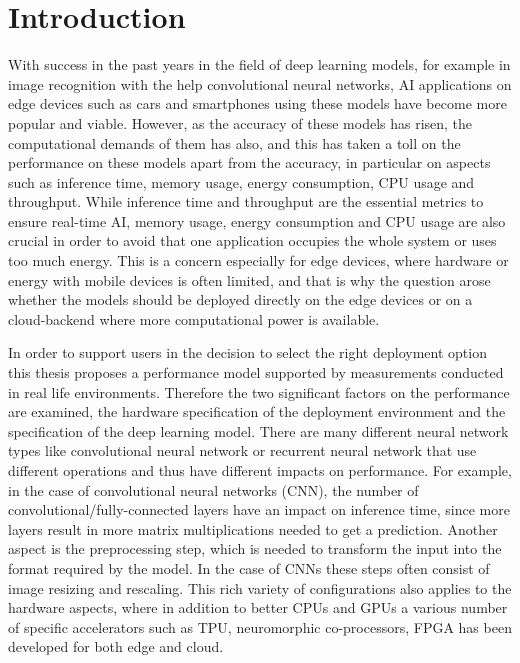 \chapter{Introduction}



With success in the past years in the field of deep learning models, for example in image recognition with the help convolutional neural networks, AI applications on edge devices such as cars and smartphones using these models have become more popular and viable.
However, as the accuracy of these models has risen, the computational demands of them has also, and this has taken a toll on the performance on these models apart from the accuracy, in particular on aspects such as inference time, memory usage, energy consumption, CPU usage and throughput. 
While inference time and throughput are the essential metrics to ensure real-time AI, memory usage, energy consumption and CPU usage are also crucial in order to avoid that one application occupies the whole system or uses too much energy.
This is a concern especially for edge devices, where hardware or energy with mobile devices is often limited, and that is why the question arose whether the models should be deployed directly on the edge devices or on a cloud-backend where more computational power is available. 

In order to support users in the decision to select the right deployment option this thesis proposes a performance model supported by measurements conducted in real life environments.
Therefore the two significant factors on the performance are examined, the hardware specification of the deployment environment and the specification of the deep learning model. 
There are many different neural network types like convolutional neural network or recurrent neural network that use different operations and thus have different impacts on performance.
For example, in the case of convolutional neural networks (CNN), the number of convolutional/fully-connected layers have an impact on inference time, since more layers result in more matrix multiplications needed to get a prediction.
Another aspect is the preprocessing step, which is needed to transform the input into the format required by the model. In the case of CNNs these steps often consist of image resizing and rescaling.
This rich variety of configurations also applies to the hardware aspects, where in addition to better CPUs and GPUs a various number of specific accelerators such as TPU, neuromorphic co-processors, FPGA has been developed for both edge and cloud.




